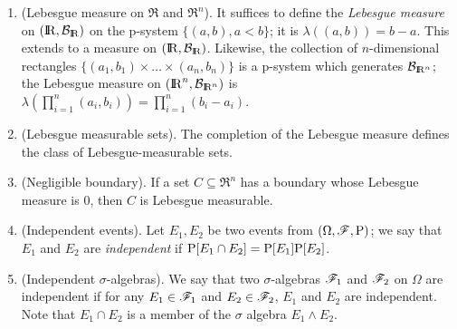 \documentclass[a4paper,10pt]{article}
\begin{document}
\begin{enumerate}
 \item (Lebesgue measure on $\Re$ and $\Re^n$). It suffices to define the \textit{Lebesgue measure} on $(\Re,\B_\Re)$
       on the p-system $\{(a,b), a<b\}$; it is $\lambda((a,b))=b - a$. This extends to a measure on  $(\Re,\B_\Re)$.
       Likewise, the collection of $n$-dimensional rectangles $\{(a_1, b_1)\times\ldots \times (a_n, b_n)\}$ is a p-system
       which generates $\B_{\Re^n}$; the Lebesgue measure on $(\Re^n, \B_{\Re^n})$ is 
       $\lambda(\prod_{i=1}^n (a_i, b_i))=\prod_{i=1}^n (b_i-a_i)$.
 
 \item (Lebesgue measurable sets). The completion of the Lebesgue measure defines the class of Lebesgue-measurable
       sets. 
             
 \item (Negligible boundary). If a set $C\subseteq \Re^n$ has a boundary whose Lebesgue measure is $0$, then 
       $C$ is Lebesgue measurable.
       
 \item (Independent events). Let $E_1,E_2$ be two events from $(\Omega,\mathscr{F},\mathrm{P})$; we say that $E_1$ and $E_2$ are \textit{independent}
       if $\mathrm{P}[E_1\cap E_2] = \mathrm{P}[E_1]\mathrm{P}[E_2]$.
       
 \item (Independent $\sigma$-algebras). We say that two $\sigma$-algebras $\mathscr{F}_1$ and $\mathscr{F}_2$ on $\Omega$ 
       are independent if for any $E_1\in \mathscr{F}_1$ and $E_2\in\mathscr{F}_2$, $E_1$ and $E_2$ are independent.
       Note that $E_1\cap E_2$ is a member of the $\sigma$ algebra $E_1 \wedge E_2$.
\end{enumerate}
\end{document}
